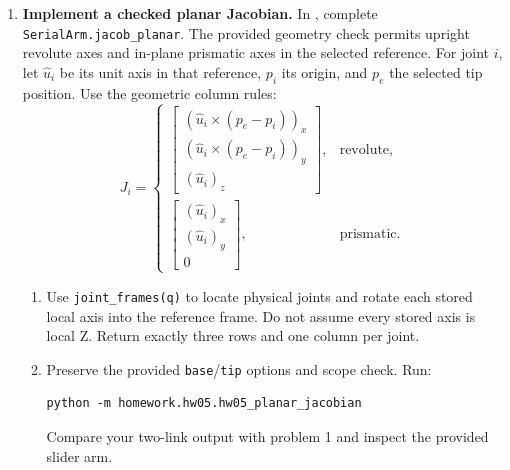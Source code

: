 \begin{enumerate}
\item \textbf{Implement a checked planar Jacobian.}
In , complete
\texttt{SerialArm.jacob\_planar}. The provided geometry check permits
upright revolute axes and in-plane prismatic axes in the selected reference.
For joint $i$, let $\hat u_i$ be its unit axis in that reference, $p_i$ its origin,
and $p_e$ the selected tip position. Use the geometric column rules:
\[
J_i=\begin{cases}
\begin{bmatrix}(\hat u_i\times(p_e-p_i))_x\\(\hat u_i\times(p_e-p_i))_y\\(\hat u_i)_z\end{bmatrix},
&\text{revolute},\\[4pt]
\begin{bmatrix}(\hat u_i)_x\\(\hat u_i)_y\\0\end{bmatrix},&\text{prismatic}.
\end{cases}
\]
\begin{enumerate}
\item Use \texttt{joint\_frames(q)} to locate physical joints and rotate
each stored local axis into the reference frame. Do not assume every stored
axis is local Z. Return exactly three rows and one column per joint.
\item Preserve the provided \texttt{base}/\texttt{tip} options and scope
check. Run:
\begin{lstlisting}
python -m homework.hw05.hw05_planar_jacobian
\end{lstlisting}
Compare your two-link output with problem 1 and inspect the provided slider arm.
\end{enumerate}
\end{enumerate}

